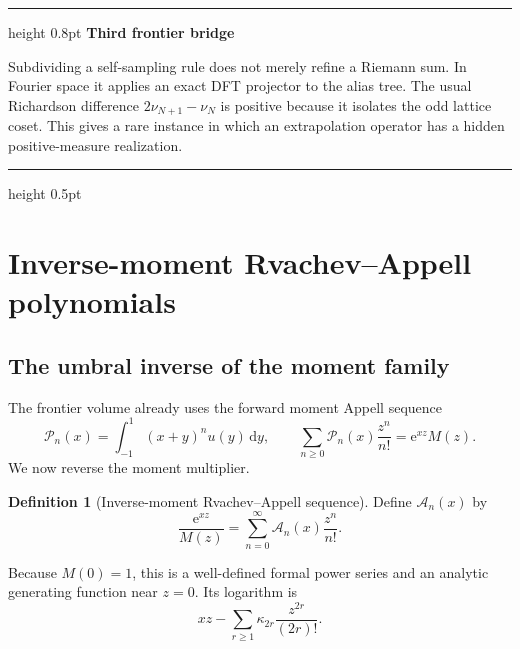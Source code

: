 \documentclass[11pt]{article}
\numberwithin{equation}{section}
\theoremstyle{definition}
\newtheorem{definition}[theorem]{Definition}
\theoremstyle{remark}
\newenvironment{resultbox}[1][]
{\begin{center}\begin{minipage}{0.94\textwidth}%
\color{navy}\hrule height 0.8pt\vspace{0.45em}%
\color{black}\textbf{#1}\par\smallskip}
{\vspace{0.35em}\color{navy}\hrule height 0.5pt\end{minipage}\end{center}}
\newcommand{\dd}{\,\mathrm d}
\newcommand{\e}{\mathrm e}
\newcommand{\Acal}{\mathscr A}
\newcommand{\Pcal}{\mathcal P}
\begin{document}
\begin{resultbox}[Third frontier bridge]
Subdividing a self-sampling rule does not merely refine a Riemann sum.  In Fourier space it applies an exact DFT projector to the alias tree.  The usual Richardson difference $2\nu_{N+1}-\nu_N$ is positive because it isolates the odd lattice coset.  This gives a rare instance in which an extrapolation operator has a hidden positive-measure realization.
\end{resultbox}

\section{Inverse-moment Rvachev--Appell polynomials}
\label{sec:appell}

\subsection{The umbral inverse of the moment family}

The frontier volume already uses the forward moment Appell sequence
\begin{equation}
 \Pcal_n(x)=\int_{-1}^{1}(x+y)^n u(y)\dd y,
 \qquad
 \sum_{n\ge0}\Pcal_n(x)\frac{z^n}{n!}=\e^{xz}M(z).
 \label{eq:forward-Appell}
\end{equation}
We now reverse the moment multiplier.

\begin{definition}[Inverse-moment Rvachev--Appell sequence]
\label{def:inverse-Appell}
Define $\Acal_n(x)$ by
\begin{equation}
 \boxed{\displaystyle
 \frac{\e^{xz}}{M(z)}
 =\sum_{n=0}^{\infty}\Acal_n(x)\frac{z^n}{n!}.}
 \label{eq:inverse-Appell-gen}
\end{equation}
\end{definition}

Because $M(0)=1$, this is a well-defined formal power series and an analytic generating function near $z=0$.  Its logarithm is
\begin{equation}
 xz-\sum_{r\ge1}\kappa_{2r}\frac{z^{2r}}{(2r)!}.
 \label{eq:inverse-Appell-log}
\end{equation}
\end{document}

